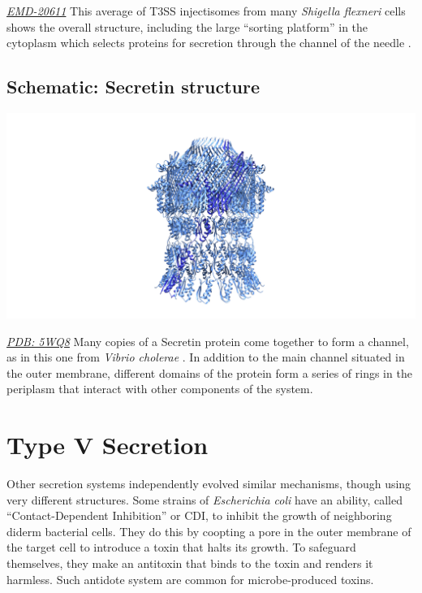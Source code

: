 \documentclass[]{tufte-book}
\begin{document}
\href{https://www.ebi.ac.uk/pdbe/entry/emdb/EMD-20611}{\emph{EMD-20611}}
This average of T3SS injectisomes from many \emph{Shigella flexneri} cells shows the overall structure, including the large ``sorting platform'' in the cytoplasm which selects proteins for secretion through the channel of the needle \citep{tachiyama2019}.

\hypertarget{Secretin_structure}{%
\subsection*{Schematic: Secretin structure}\label{Secretin_structure}}

\includegraphics{img/schematics/9_4_2}

\href{http://rcsb.org/structure/5WQ8}{\emph{PDB: 5WQ8}}
Many copies of a Secretin protein come together to form a channel, as in this one from \emph{Vibrio cholerae} \citep{yan2017a}. In addition to the main channel situated in the outer membrane, different domains of the protein form a series of rings in the periplasm that interact with other components of the system.

\hypertarget{type-v-secretion}{%
\section{Type V Secretion}\label{type-v-secretion}}

Other secretion systems independently evolved similar mechanisms, though using very different structures. Some strains of \emph{Escherichia coli} have an ability, called ``Contact-Dependent Inhibition'' or CDI, to inhibit the growth of neighboring diderm bacterial cells. They do this by coopting a pore in the outer membrane of the target cell to introduce a toxin that halts its growth. To safeguard themselves, they make an antitoxin that binds to the toxin and renders it harmless. Such antidote system are common for microbe-produced toxins.
\end{document}
